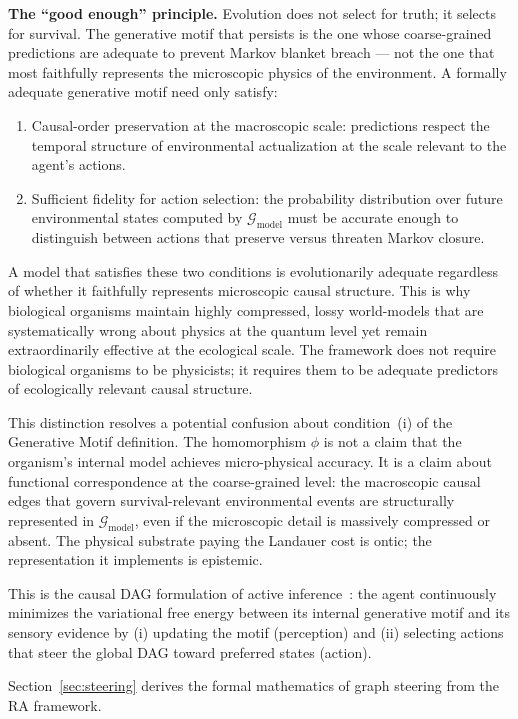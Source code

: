 \documentclass[11pt,a4paper]{article}
\theoremstyle{remark}
\newcommand{\GG}{\mathcal{G}}
\begin{document}
\textbf{The ``good enough'' principle.} Evolution does not select for truth; it
selects for survival. The generative motif that persists is the one whose
coarse-grained predictions are adequate to prevent Markov blanket breach --- not
the one that most faithfully represents the microscopic physics of the environment.
A formally adequate generative motif need only satisfy:
\begin{enumerate}[noitemsep, label=(\roman*)]
  \item Causal-order preservation at the macroscopic scale: predictions respect
    the temporal structure of environmental actualization at the scale relevant
    to the agent's actions.
  \item Sufficient fidelity for action selection: the probability distribution
    over future environmental states computed by $\GG_{\mathrm{model}}$ must be
    accurate enough to distinguish between actions that preserve versus threaten
    Markov closure.
\end{enumerate}
A model that satisfies these two conditions is evolutionarily adequate regardless
of whether it faithfully represents microscopic causal structure. This is why
biological organisms maintain highly compressed, lossy world-models that are
systematically wrong about physics at the quantum level yet remain extraordinarily
effective at the ecological scale. The framework does not require biological
organisms to be physicists; it requires them to be adequate predictors of
ecologically relevant causal structure.

This distinction resolves a potential confusion about condition~(i) of the
Generative Motif definition. The homomorphism $\phi$ is not a claim that the
organism's internal model achieves micro-physical accuracy. It is a claim about
functional correspondence at the coarse-grained level: the macroscopic causal
edges that govern survival-relevant environmental events are structurally
represented in $\GG_{\mathrm{model}}$, even if the microscopic detail is massively
compressed or absent. The physical substrate paying the Landauer cost is ontic;
the representation it implements is epistemic.

This is the causal DAG formulation of active inference~\citep{Friston2010}:
the agent continuously minimizes the variational free energy between its internal
generative motif and its sensory evidence by (i) updating the motif (perception)
and (ii) selecting actions that steer the global DAG toward preferred states (action).

Section~\ref{sec:steering} derives the formal mathematics of graph steering from
the RA framework.
\end{document}
